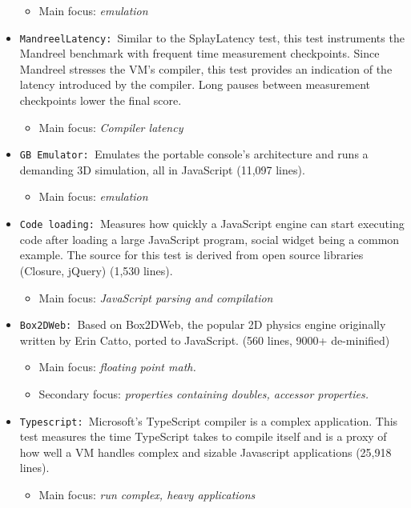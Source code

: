 \begin{itemize}
  \begin{itemize}
    \item Main focus: \textit{emulation}
  \end{itemize}
  \item \texttt{MandreelLatency: }Similar to the SplayLatency test, this test instruments the Mandreel benchmark with frequent time measurement checkpoints. Since Mandreel stresses the VM's compiler, this test provides an indication of the latency introduced by the compiler. Long pauses between measurement checkpoints lower the final score.
  \begin{itemize}
    \item Main focus: \textit{Compiler latency}
  \end{itemize}
  \item \texttt{GB Emulator: }Emulates the portable console's architecture and runs a demanding 3D simulation, all in JavaScript (11,097 lines).
  \begin{itemize}
    \item Main focus: \textit{emulation}
  \end{itemize}
    \item \texttt{Code loading: }Measures how quickly a JavaScript engine can start executing code after loading a large JavaScript program, social widget being a common example. The source for this test is derived from open source libraries (Closure, jQuery) (1,530 lines).
  \begin{itemize}
    \item Main focus: \textit{JavaScript parsing and compilation}
  \end{itemize}
    \item \texttt{Box2DWeb: }Based on Box2DWeb, the popular 2D physics engine originally written by Erin Catto, ported to JavaScript. (560 lines, 9000+ de-minified)
  \begin{itemize}
    \item Main focus: \textit{floating point math.}
    \item Secondary focus: \textit{properties containing doubles, accessor properties.}
  \end{itemize}
    \item \texttt{Typescript: }Microsoft's TypeScript compiler is a complex application. This test measures the time TypeScript takes to compile itself and is a proxy of how well a VM handles complex and sizable Javascript applications (25,918 lines).
  \begin{itemize}
    \item Main focus: \textit{run complex, heavy applications}
  \end{itemize}
\end{itemize}
